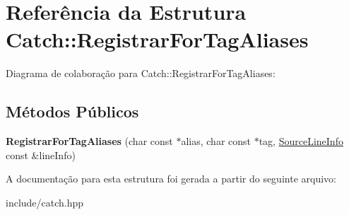 \hypertarget{structCatch_1_1RegistrarForTagAliases}{}\section{Referência da Estrutura Catch\+:\+:Registrar\+For\+Tag\+Aliases}
\label{structCatch_1_1RegistrarForTagAliases}


Diagrama de colaboração para Catch\+:\+:Registrar\+For\+Tag\+Aliases\+:
\subsection*{Métodos Públicos}
\begin{DoxyCompactItemize}
\item 
{\bfseries Registrar\+For\+Tag\+Aliases} (char const $\ast$alias, char const $\ast$tag, \hyperlink{structCatch_1_1SourceLineInfo}{Source\+Line\+Info} const \&line\+Info)\hypertarget{structCatch_1_1RegistrarForTagAliases_ae4e45830e4763bcd65d55d8db9167b69}{}\label{structCatch_1_1RegistrarForTagAliases_ae4e45830e4763bcd65d55d8db9167b69}

\end{DoxyCompactItemize}


A documentação para esta estrutura foi gerada a partir do seguinte arquivo\+:\begin{DoxyCompactItemize}
\item 
include/catch.\+hpp\end{DoxyCompactItemize}
